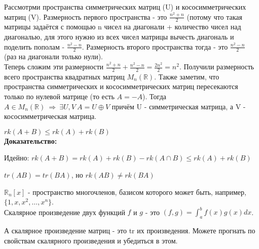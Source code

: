 \documentclass[12pt]{article}
\newcommand{\R}{\mathbb{R}}
\begin{document}
\begin{remarkbox}
    Рассмотрми пространства симметрических матриц (U) и кососимметрических матриц (V). Размерность первого пространства - это $\frac{n^2 + n}{2}$ (потому что такая матрицы задаётся с помощью n чисел на диагонали + количество чисел над диагональю, для этого нужно из всех чисел матрицы вычесть диагональ и поделить пополам - $\frac{n^2 - n}{2}$. Размерность второго пространства тогда - это $\frac{n^2 - n}{2}$ (раз на диагонали только нули).\\

    Теперь сложим эти размерности $\frac{n^2 + n}{2} + \frac{n^2 - n}{2} = \frac{2n^2}{2} = n^2$. Получили размерность всего пространства квадратных матриц $M_n(\R)$. Также заметим, что пространства симметрических и кососимметрических матриц пересекаются только по нулевой матрице (то есть $A = - A$). Тогда $A \in M_n(\R) \ \Rightarrow \ \exists U, V \ A = U \oplus V$ причём U - симметрическая матрица, а V - кососимметрическая матрица.
\end{remarkbox}

\begin{theorembox}
    $rk(A + B) \leq rk(A) + rk(B)$\\

    \textbf{Доказательство:}

    Идейно: $rk(A+B) = rk(A) +rk(B) - rk(A\cap B) \leq rk(A) + rk(B)$
\end{theorembox}

\begin{remarkbox}
    $tr(AB) = tr(BA)$, но $rk(AB) \neq rk(BA)$
\end{remarkbox}

\begin{definitionbox}
    $\R_n[x]$ - пространство многочленов, базисом которого может быть, например, $\{1, x, x^2,\dots, x^n\}$.\\

    Скалярное произведение двух функций $f$ и $g$ - это $(f, g) = \int_a^b f(x)g(x)dx$.
\end{definitionbox}

\begin{remarkbox}
    А скалярное произведение матриц - это tr их произведения. Можете прогнать по свойствам скалярного произведения и убедиться в этом.
\end{remarkbox}
\end{document}
